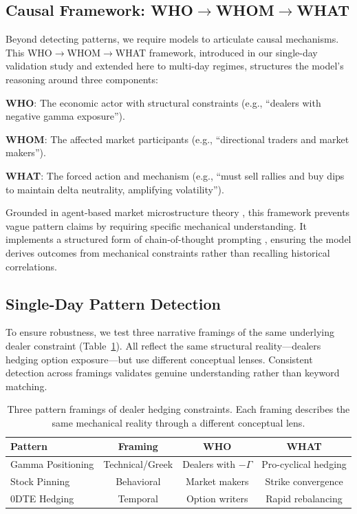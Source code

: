 \subsection{Causal Framework: \texorpdfstring{WHO$\rightarrow$WHOM$\rightarrow$WHAT}{WHO->WHOM->WHAT}}
\label{subsec:causal}

Beyond detecting patterns, we require models to articulate causal mechanisms. This WHO$\rightarrow$WHOM$\rightarrow$WHAT framework, introduced in our single-day validation study \citep{regan2025obfuscation} and extended here to multi-day regimes, structures the model's reasoning around three components:

\textbf{WHO}: The economic actor with structural constraints (e.g., ``dealers with negative gamma exposure'').

\textbf{WHOM}: The affected market participants (e.g., ``directional traders and market makers'').

\textbf{WHAT}: The forced action and mechanism (e.g., ``must sell rallies and buy dips to maintain delta neutrality, amplifying volatility'').

Grounded in agent-based market microstructure theory \citep{grossman1988liquidity,garleanu2009demand}, this framework prevents vague pattern claims by requiring specific mechanical understanding. It implements a structured form of chain-of-thought prompting \citep{wei2022chain}, ensuring the model derives outcomes from mechanical constraints rather than recalling historical correlations.


\subsection{Single-Day Pattern Detection}
\label{subsec:single_day_method}

To ensure robustness, we test three narrative framings of the same underlying dealer constraint (Table~\ref{tab:patterns}). All reflect the same structural reality---dealers hedging option exposure---but use different conceptual lenses. Consistent detection across framings validates genuine understanding rather than keyword matching.

\begin{table}[H]
\centering
\caption{Three pattern framings of dealer hedging constraints. Each framing describes the same mechanical reality through a different conceptual lens.}
\label{tab:patterns}
\small
\begin{tabular}{@{}lccc@{}}
\toprule
\textbf{Pattern} & \textbf{Framing} & \textbf{WHO} & \textbf{WHAT} \\
\midrule
Gamma Positioning & Technical/Greek & Dealers with $-\Gamma$ & Pro-cyclical hedging \\
Stock Pinning & Behavioral & Market makers & Strike convergence \\
0DTE Hedging & Temporal & Option writers & Rapid rebalancing \\
\bottomrule
\end{tabular}
\end{table}

